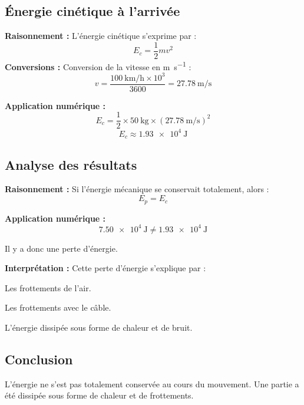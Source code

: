 \documentclass[a4paper,12pt]{article}
\begin{document}
\subsection*{Énergie cinétique à l'arrivée}
\textbf{Raisonnement :} L'énergie cinétique s'exprime par :
\begin{equation}
    E_c = \frac{1}{2} m v^2
\end{equation}
\textbf{Conversions :}
Conversion de la vitesse en \si{\meter\per\second} :
\begin{equation}
    v = \frac{\SI{100}{\kilo\meter\per\hour} \times 10^3}{3600} = \SI{27.78}{\meter\per\second}
\end{equation}

\textbf{Application numérique :}
\begin{equation}
    E_c = \frac{1}{2} \times \SI{50}{\kilo\gram} \times (\SI{27.78}{\meter\per\second})^2
\end{equation}
\begin{equation}
    E_c \approx \SI{1.93e4}{\joule}
\end{equation}

\subsection*{Analyse des résultats}
\textbf{Raisonnement :} Si l'énergie mécanique se conservait totalement, alors :
\begin{equation}
    E_p = E_c
\end{equation}

\textbf{Application numérique :}
\begin{equation}
    \SI{7.50e4}{\joule} \neq \SI{1.93e4}{\joule}
\end{equation}

Il y a donc une perte d'énergie. 

\textbf{Interprétation :} Cette perte d'énergie s'explique par :
\begin{compactitem}
    \item Les frottements de l'air.
    \item Les frottements avec le câble.
    \item L'énergie dissipée sous forme de chaleur et de bruit.
\end{compactitem}

\subsection*{Conclusion}
L'énergie ne s'est pas totalement conservée au cours du mouvement. Une partie a été dissipée sous forme de chaleur et de frottements.
\end{document}
